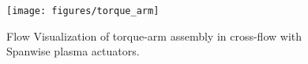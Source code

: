 \begin{figure}
	\begin{center}
		\centerline{\texttt{[image: figures/torque\_arm]}}
		\caption{Flow Visualization of torque-arm assembly in cross-flow with Spanwise plasma actuators.}
		\label{fig:cyl2}
	\end{center}
\end{figure}


%
%
